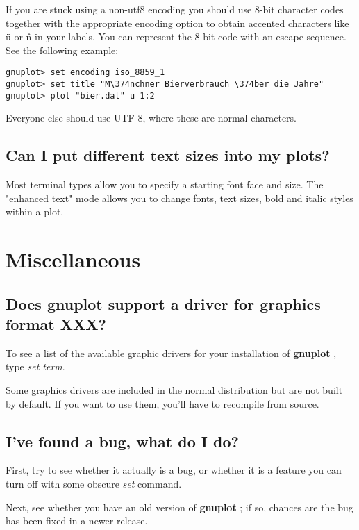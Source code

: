 \documentclass[letter,11pt]{article}
\newcommand{\gnuplot}{\textbf{gnuplot }}
\begin{document}
{If you are stuck using a non-utf8 encoding you should use
8-bit character codes together with the appropriate encoding option
to obtain accented characters like \"u or \^n in your labels.
You can represent the 8-bit code with an escape sequence.
See the following example:

\small
\begin{verbatim}
gnuplot> set encoding iso_8859_1
gnuplot> set title "M\374nchner Bierverbrauch \374ber die Jahre"
gnuplot> plot "bier.dat" u 1:2
\end{verbatim}
\normalsize

Everyone else should use UTF-8, where these are normal characters.

\subsection{Can I put different text sizes into my plots?}

Most terminal types allow you to specify a starting font face and size.
The "enhanced text" mode allows you to change fonts, text sizes, bold and
italic styles within a plot.



\section{Miscellaneous}

\subsection{Does \gnuplot support a driver for graphics format XXX?}

To see a list of the available graphic drivers for your installation of
\gnuplot, type {\em set term}.

Some graphics drivers are included in the normal distribution
but are not built by default. If you want to use them, you'll
have to recompile from source.

\subsection{I've found a bug, what do I do?}

First, try to see whether it actually is a bug, or whether it
is a feature you can turn off with some obscure {\em set} command.

Next, see whether you have an old version of \gnuplot; if so,
chances are the bug has been fixed in a newer release.

}
\end{document}
